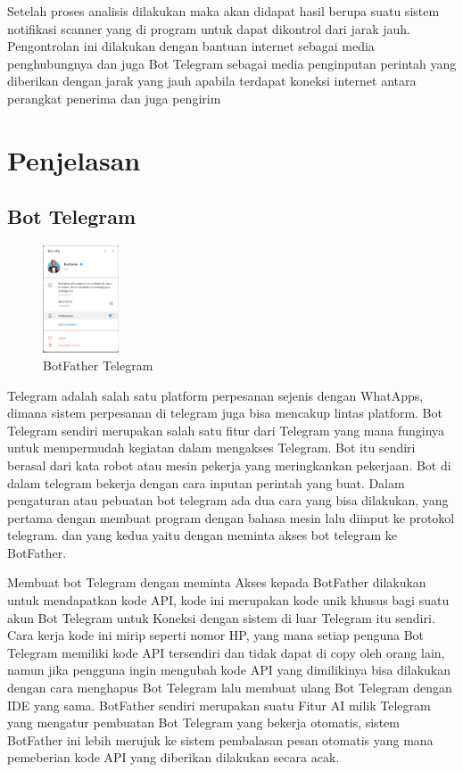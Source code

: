 \documentclass[conference]{IEEEtran}
\begin{document}
    Setelah proses analisis dilakukan maka akan didapat hasil
berupa suatu sistem notifikasi scanner yang di program untuk dapat
dikontrol dari jarak jauh. Pengontrolan ini dilakukan dengan
bantuan internet sebagai media penghubungnya dan juga Bot
Telegram sebagai media penginputan perintah yang diberikan
dengan jarak yang jauh apabila terdapat koneksi internet 
antara perangkat penerima dan juga pengirim 


\section{Penjelasan}
\subsection{Bot Telegram}
\vspace{0.2cm}
\begin{figure}[h]
    \centering
    \includegraphics[width=0.2\textwidth]{Botfather.png}
    \caption{BotFather Telegram}
\end{figure}

    Telegram adalah salah satu platform perpesanan sejenis dengan
    WhatApps, dimana sistem perpesanan di telegram juga bisa mencakup
    lintas platform. Bot Telegram 
    sendiri merupakan salah satu fitur dari Telegram yang mana funginya untuk
    mempermudah kegiatan dalam mengakses Telegram. Bot itu sendiri
    berasal dari kata robot atau mesin pekerja yang meringkankan pekerjaan.
    Bot di dalam telegram bekerja dengan cara inputan perintah yang buat.
    Dalam pengaturan atau pebuatan bot telegram ada dua cara yang 
    bisa dilakukan, yang pertama dengan membuat program dengan bahasa
    mesin lalu diinput ke protokol telegram. dan yang kedua yaitu dengan
    meminta akses bot telegram ke BotFather.
   
    
        Membuat bot Telegram dengan meminta Akses kepada BotFather dilakukan untuk
    mendapatkan kode API, kode ini merupakan kode unik khusus bagi suatu
    akun Bot Telegram untuk Koneksi dengan sistem di luar Telegram itu
    sendiri. Cara kerja kode ini mirip seperti nomor HP, yang mana setiap
    penguna Bot Telegram memiliki kode API tersendiri dan tidak dapat di copy
    oleh orang lain, namun jika pengguna ingin mengubah kode API yang
    dimilikinya bisa dilakukan dengan cara menghapus Bot Telegram lalu
    membuat ulang Bot Telegram dengan IDE yang sama.
    BotFather sendiri merupakan suatu Fitur AI milik Telegram yang
    mengatur pembuatan Bot Telegram yang bekerja otomatis, sistem
    BotFather ini lebih merujuk ke sistem pembalasan pesan otomatis yang
    mana pemeberian kode API yang diberikan dilakukan secara acak.
\end{document}
